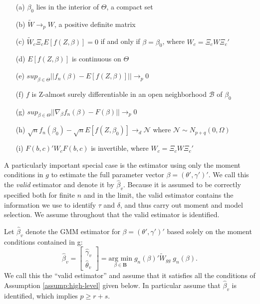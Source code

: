 \begin{assump}
  \label{assump:high-level}
    \mbox{}
\begin{itemize}
\item[(a)] $\beta_0$ lies in the interior of $\Theta$, a compact set
\item[(b)] $\widetilde{W} \rightarrow_{p} W$, a positive definite matrix
\item[(c)] $\widetilde{W}_c \Xi_c E[f(Z, \beta)] = 0$ if and only if $\beta = \beta_0$, where $W_c = \Xi_c W \Xi_c'$
\item[(d)] $E[f(Z,\beta)]$ is continuous on $\Theta$
\item[(e)] $sup_{\beta\in \Theta} ||f_n(\beta) - E[f(Z,\beta)]||\rightarrow_p 0$
\item[(f)] $f$ is Z-almost surely differentiable in an open neighborhood $\mathcal{B}$ of $\beta_0$
\item[(g)] $sup_{\beta \in \Theta} ||\nabla_{\beta} f_n(\beta) - F(\beta)|| \rightarrow_p 0 $
\item[(h)] $\sqrt{n}f_n(\beta_0) - \sqrt{n}E[f(Z,\beta_0)] \rightarrow_d \mathscr{N}$ where $\mathscr{N} \sim N_{p+q}(0,\Omega)$
\item[(i)] $F(b,c)' W_c F(b,c)$ is invertible, where $W_c = \Xi_c W \Xi_c'$
\end{itemize}
\end{assump}

  A particularly important special case is the estimator using only the moment conditions in $g$ to estimate the full parameter vector $\beta = \left(\theta', \gamma' \right)'$.
  We call this the \emph{valid} estimator and denote it by $\widehat{\beta}_v$.  
  Because it is assumed to be correctly specified both for finite $n$ and in the limit, the valid estimator contains the information we use to identify $\tau$ and $\delta$, and thus carry out moment and model selection. 
We assume throughout that the valid estimator is identified.

\begin{assump}
  Let $\widehat{\beta}_v$ denote the GMM estimator for $\beta = \left(\theta', \gamma' \right)'$ based solely on the moment conditions contained in g:
\begin{equation}
  \widehat{\beta}_v =\left[\begin{array}{c}\widehat{\gamma}_{v} \\  \widehat{\theta}_{v} \end{array} \right] =\underset{\beta \in \mathbf{B}}{\mbox{arg min}}\; g_n(\beta)' \widetilde{W}_{gg} \; g_n(\beta).
\end{equation}
We call this the ``valid estimator'' and assume that it satisfies all the conditions of Assumption \ref{assump:high-level} given below.
In particular assume that $\widehat{\beta}_v$ is identified, which implies $p \geq r+s$.
\end{assump}

